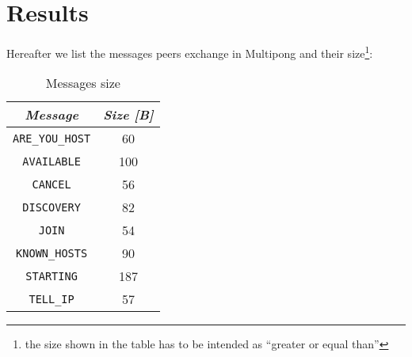 \section{Results}

Hereafter we list the messages peers exchange in Multipong and their
size\footnote{the size shown in the table has to be intended as ``greater or
equal than''}:

\begin{table}[H]
  \centering
  \begin{tabular}{cc}
    \textbf{\textit{Message}} & \textbf{\textit{Size [B]}} \\
    \hline
    \texttt{ARE\_YOU\_HOST} & 60 \\
    \hline
    \texttt{AVAILABLE} & 100 \\
    \hline
    \texttt{CANCEL} & 56 \\
    \hline
    \texttt{DISCOVERY} & 82 \\
    \hline
    \texttt{JOIN} & 54 \\
    \hline
    \texttt{KNOWN\_HOSTS} & 90 \\
    \hline
    \texttt{STARTING} & 187 \\
    \hline
    \texttt{TELL\_IP} & 57 \\
    \hline
  \end{tabular}
  \caption{Messages size}
  \label{tab:sizes}
\end{table}


